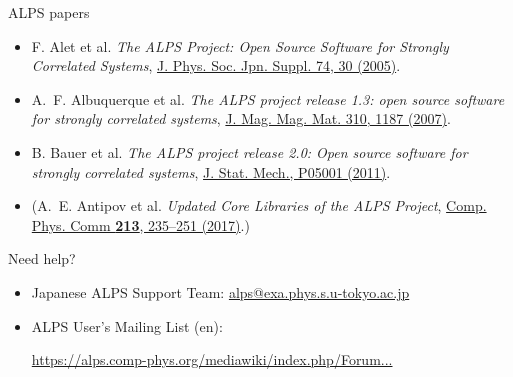 \begin{frame}[t,fragile]{ALPS papers}
  \begin{itemize}
    \setlength{\itemsep}{1em}
  \item F. Alet et al. {\it The ALPS Project: Open Source Software for
    Strongly Correlated Systems}, \href{http://jpsj.ipap.jp/link?JPSJS/74S/30}{J. Phys. Soc. Jpn. Suppl. 74, 30 (2005)}.
  \item A.~F. Albuquerque et al. {\it The ALPS project release 1.3: open source software for strongly correlated systems}, \href{http://dx.doi.org/10.1016/j.jmmm.2006.10.304}{J. Mag. Mag. Mat. 310, 1187 (2007)}.
  \item B. Bauer et al. {\it The ALPS project release 2.0: Open source software for strongly correlated systems}, \href{http://iopscience.iop.org/1742-5468/2011/05/P05001}{J. Stat. Mech., P05001 (2011)}.
  \item (A.~E. Antipov et al. {\it Updated Core Libraries of the ALPS Project}, \href{http://dx.doi.org/10.1016/j.cpc.2016.12.009}{Comp. Phys. Comm {\bf 213}, 235--251 (2017)}.)
  \end{itemize}
\end{frame}

\begin{frame}[t,fragile]{Need help?}
  \begin{itemize}
    \setlength{\itemsep}{1em}
  \item Japanese ALPS Support Team: {\href{mailto:alps@exa.phys.s.u-tokyo.ac.jp}{alps@exa.phys.s.u-tokyo.ac.jp}}
  \item ALPS User's Mailing List (en):

    {\footnotesize \href{https://alps.comp-phys.org/mediawiki/index.php/Forum:Overview}{https://alps.comp-phys.org/mediawiki/index.php/Forum...}}
  \end{itemize}
\end{frame}

